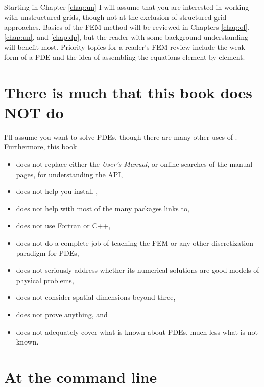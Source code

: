 Starting in Chapter \ref{chap:un} I will assume that you are interested in working with unstructured grids, though not at the exclusion of structured-grid approaches.  Basics of the FEM method will be reviewed in Chapters \ref{chap:of}, \ref{chap:un}, and \ref{chap:dp}, but the reader with some background understanding will benefit most.  Priority topics for a reader's FEM review include the weak form of a PDE and the idea of assembling the equations element-by-element.


\section{There is much that this book does NOT do}

I'll assume you want to solve PDEs, though there are many other uses of \PETSc.  Furthermore, this book\begin{itemize}
\item  does not replace either the \PETSc \emph{User's Manual}, or online searches of the \PETSc manual pages, for understanding the API,
\item  does not help you install \PETSc,
\item  does not help with most of the many packages \PETSc links to,
\item  does not use Fortran or C++,
\item  does not do a complete job of teaching the FEM or any other discretization paradigm for PDEs,
\item  does not seriously address whether its numerical solutions are good models of physical problems,
\item  does not consider spatial dimensions beyond three,
\item  does not prove anything, and
\item  does not adequately cover what is known about PDEs, much less what is not known.
\end{itemize}


\section{At the command line}

